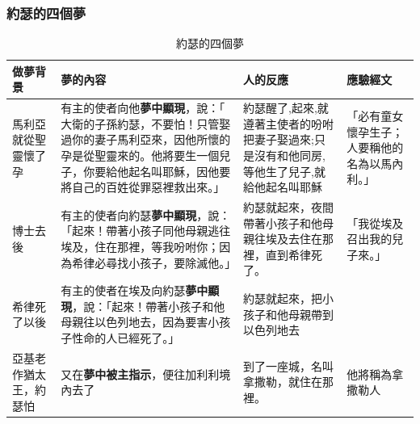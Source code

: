 \subsubsection{約瑟的四個夢}

\begin{table}[H]
  \centering
    \begin{tabular}{p{}|p{22.2em}|p{11.7em}|p{}}
    \toprule
     \textcolor[rgb]{ .267,  .447,  .769}{\textbf{做夢背景}} 
    & \textcolor[rgb]{ .267,  .447,  .769}{\textbf{夢的內容}}
       & \textcolor[rgb]{ .267,  .447,  .769}{\textbf{人的反應}} 
     & \textcolor[rgb]{ .267,  .447,  .769}{\textbf{應驗經文}} \\    
  \midrule    
    馬利亞就從聖靈懷了孕  &有主的使者向他\textbf{夢中顯現}，說：「 大衛的子孫約瑟，不要怕！只管娶過你的妻子馬利亞來，因他所懷的孕是從聖靈來的。他將要生一個兒子，你要給他起名叫耶穌，因他要將自己的百姓從罪惡裡救出來。」  &約瑟醒了,起來,就遵著主使者的吩咐把妻子娶過來;只是沒有和他同房,等他生了兒子,就給他起名叫耶穌 &「必有童女懷孕生子；人要稱他的名為以馬內利。」 \\ %
  \midrule  
     博士去後& 有主的使者向約瑟\textbf{夢中顯現}，說：「起來！帶著小孩子同他母親逃往埃及，住在那裡，等我吩咐你；因為希律必尋找小孩子，要除滅他。」 & 約瑟就起來，夜間帶著小孩子和他母親往埃及去住在那裡，直到希律死了。 &「我從埃及召出我的兒子來。」\\%
    \midrule  
希律死了以後    &有主的使者在埃及向約瑟\textbf{夢中顯現}，說：「起來！帶著小孩子和他母親往以色列地去，因為要害小孩子性命的人已經死了。」 &約瑟就起來，把小孩子和他母親帶到以色列地去&\\%
    \midrule  
   亞基老作猶太王，約瑟怕&又在\textbf{夢中被主指示}，便往加利利境內去了 &到了一座城，名叫拿撒勒，就住在那裡。 &他將稱為拿撒勒人\\%
    \midrule 
    \bottomrule
    \end{tabular}%
  \label{tab:addlabel}%
   \caption{約瑟的四個夢}
\end{table}%

